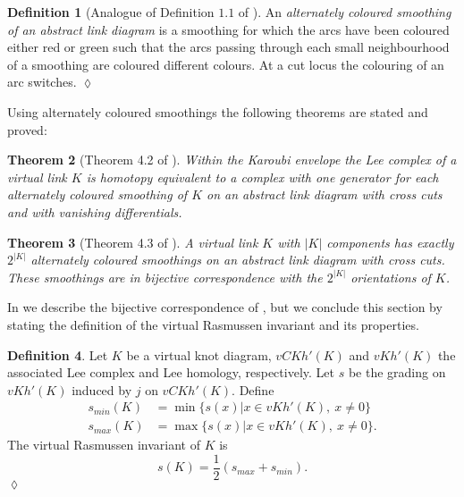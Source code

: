 \documentclass[10pt,oneside]{amsart}
\newtheorem{theorem}{Theorem}[section]
\theoremstyle{definition}
\newtheorem{definition}[theorem]{Definition}
\numberwithin{equation}{section}
\DeclareRobustCommand{\CloseDef}{	\leavevmode\unskip\penalty9999 \hbox{}\nobreak\hfill
	\quad\hbox{$\lozenge$}}
\begin{document}
\begin{definition}[Analogue of Definition \(1.1\) of \cite{Bar-Natan2006}]
	\label{Def:alternatelycoloured}
	An \emph{alternately coloured smoothing of an abstract link diagram} is a smoothing for which the arcs have been coloured either red or green such that the arcs passing through each small neighbourhood of a smoothing are coloured different colours. At a cut locus the colouring of an arc switches.\CloseDef
\end{definition}

Using alternately coloured smoothings the following theorems are stated and proved:

\begin{theorem}[Theorem 4.2 of \cite{Dye2014}]
	\label{Thm:Dye1}
	Within the Karoubi envelope the Lee complex of a virtual link \( K \) is homotopy equivalent to a complex with one generator for each alternately coloured smoothing of \( K \) on an abstract link diagram with cross cuts and with vanishing differentials.
\end{theorem}

\begin{theorem}[Theorem 4.3 of \cite{Dye2014}]
	\label{Thm:Dye2}
	A virtual link \( K \) with \( | K | \) components has exactly \( 2^{|K|} \) alternately coloured smoothings on an abstract link diagram with cross cuts. These smoothings are in bijective correspondence with the \( 2^{|K|} \) orientations of \( K \).
\end{theorem}

In  we describe the bijective correspondence of , but we conclude this section by stating the definition of the virtual Rasmussen invariant and its properties.

\begin{definition}
	\label{Def:virtualRasmussen}
	Let \( K \) be a virtual knot diagram, \( {vCKh} ' ( K )\) and \( {vKh} ' ( K ) \) the associated Lee complex and Lee homology, respectively. Let \( s \) be the grading on \( {vKh} ' ( K ) \) induced by \( j \) on \( {vCKh} ' ( K ) \). Define
	\begin{equation*}
	\begin{aligned}
	s_{min} ( K ) &= \min \lbrace s ( x ) | x \in {vKh} ' ( K ),~ x \neq 0 \rbrace \\
	s_{max} ( K ) &= \max \lbrace s ( x ) | x \in {vKh} ' ( K ),~ x \neq 0 \rbrace.
	\end{aligned}
	\end{equation*}
	The virtual Rasmussen invariant of \( K \) is
	\begin{equation*}
	s ( K ) = \frac{1}{2} \left( s_{max} + s_{min} \right).
	\end{equation*}\CloseDef
\end{definition}
\end{document}
